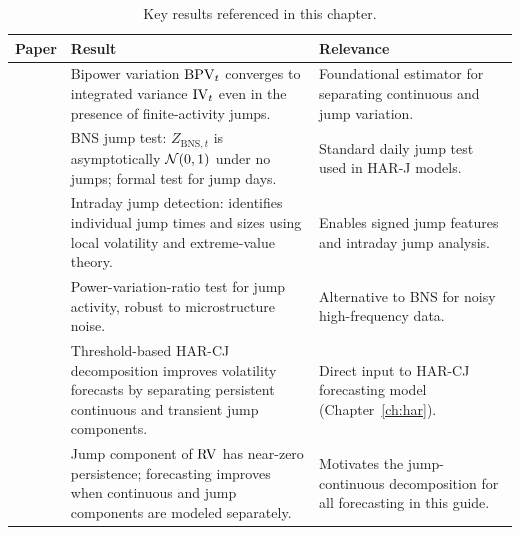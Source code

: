\begin{table}[htbp]
\centering
\caption{Key results referenced in this chapter.}
\label{tab:ch04-key-results}
\begin{tabular}{@{} p{4.2cm} p{6cm} p{4.3cm} @{}}
\toprule
\textbf{Paper} & \textbf{Result} & \textbf{Relevance} \\
\midrule
\citet{BNS2004} &
Bipower variation $\operatorname{BPV}_t$ converges to integrated variance $\operatorname{IV}_t$ even in the presence of finite-activity jumps. &
Foundational estimator for separating continuous and jump variation. \\[6pt]

\citet{BNS2006} &
BNS jump test: $Z_{\text{BNS},t}$ is asymptotically $\mathcal{N}(0,1)$ under no jumps; formal test for jump days. &
Standard daily jump test used in HAR-J models. \\[6pt]

\citet{LeeMykland2008} &
Intraday jump detection: identifies individual jump times and sizes using local volatility and extreme-value theory. &
Enables signed jump features and intraday jump analysis. \\[6pt]

\citet{AitSahaliaJacod2009} &
Power-variation-ratio test for jump activity, robust to microstructure noise. &
Alternative to BNS for noisy high-frequency data. \\[6pt]

\citet{CorsiPirinoReno2010} &
Threshold-based HAR-CJ decomposition improves volatility forecasts by separating persistent continuous and transient jump components. &
Direct input to HAR-CJ forecasting model (Chapter~\ref{ch:har}). \\[6pt]

\citet{ABD2007} &
Jump component of $\operatorname{RV}$ has near-zero persistence; forecasting improves when continuous and jump components are modeled separately. &
Motivates the jump-continuous decomposition for all forecasting in this guide. \\
\bottomrule
\end{tabular}
\end{table}
